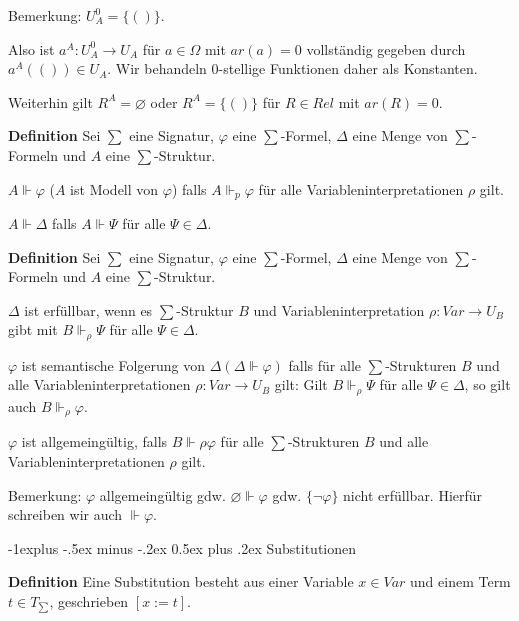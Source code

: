 \documentclass[a4paper]{article}
\makeatletter
\renewcommand{\note}[2]{\begin{noteBox} \textbf{#1} #2 \end{noteBox}}
\renewcommand{\subsection}{\@startsection{subsection}{2}{0mm}%
                {-1explus -.5ex minus -.2ex}%
                {0.5ex plus .2ex}%
                {\normalfont\normalsize\bfseries}}
\makeatother
\begin{document}
\begin{multicols}{3}
  Bemerkung: $U_A^0=\{()\}$.
  \begin{itemize*}
    \item Also ist $a^A:U_A^0\rightarrow U_A$ für $a\in\Omega$ mit $ar(a)=0$ vollständig gegeben durch $a^A(())\in U_A$. Wir behandeln 0-stellige Funktionen daher als Konstanten.
    \item Weiterhin gilt $R^A=\varnothing$ oder $R^A=\{()\}$ für $R\in Rel$ mit $ar(R)=0$.
  \end{itemize*}

  \note{Definition}{Sei $\sum$ eine Signatur, $\varphi$ eine $\sum$-Formel, $\Delta$ eine Menge von $\sum$-Formeln und $A$ eine $\sum$-Struktur.
    \begin{itemize*}
      \item $A\Vdash\varphi$ ($A$ ist Modell von $\varphi$) falls $A\Vdash_p\varphi$ für alle Variableninterpretationen $\rho$ gilt.
      \item $A\Vdash\Delta$ falls $A\Vdash\Psi$ für alle $\Psi\in\Delta$.
    \end{itemize*}
  }

  \note{Definition}{Sei $\sum$ eine Signatur, $\varphi$ eine $\sum$-Formel, $\Delta$ eine Menge von $\sum$-Formeln und $A$ eine $\sum$-Struktur.
    \begin{itemize*}
      \item $\Delta$ ist erfüllbar, wenn es $\sum$-Struktur $B$ und Variableninterpretation $\rho:Var\rightarrow U_B$ gibt mit $B\Vdash_\rho\Psi$ für alle $\Psi\in\Delta$.
      \item $\varphi$ ist semantische Folgerung von $\Delta(\Delta\Vdash\varphi)$ falls für alle $\sum$-Strukturen $B$ und alle Variableninterpretationen $\rho:Var\rightarrow U_B$ gilt: Gilt $B\Vdash_\rho\Psi$ für alle $\Psi\in\Delta$, so gilt auch $B\Vdash_\rho \varphi$.
      \item $\varphi$ ist allgemeingültig, falls $B\Vdash \rho\varphi$ für alle $\sum$-Strukturen $B$ und alle Variableninterpretationen $\rho$ gilt.
    \end{itemize*}
  }

  Bemerkung: $\varphi$ allgemeingültig gdw. $\varnothing\Vdash\varphi$ gdw. $\{\lnot\varphi\}$ nicht erfüllbar. Hierfür schreiben wir auch $\Vdash\varphi$.

  \subsection{Substitutionen}
  \note{Definition}{Eine Substitution besteht aus einer Variable $x\in Var$ und einem Term $t\in T_{\sum}$, geschrieben $[x:=t]$.}


\end{multicols}
\end{document}
